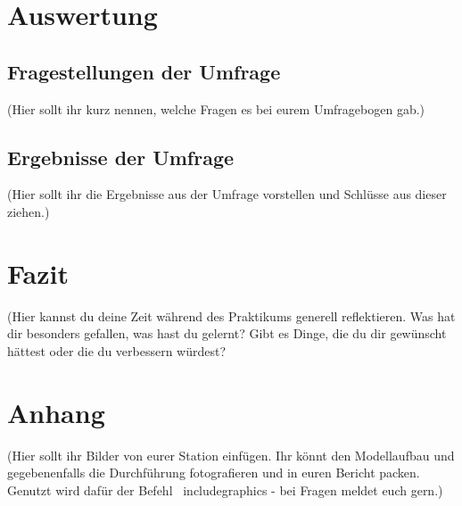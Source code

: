 \documentclass[11pt,a4paper,titlepage]{article}
\begin{document}
\newpage
\section{Auswertung}
\subsection{Fragestellungen der Umfrage}
(Hier sollt ihr kurz nennen, welche Fragen es bei eurem Umfragebogen gab.)
\subsection{Ergebnisse der Umfrage}
(Hier sollt ihr die Ergebnisse aus der Umfrage vorstellen und Schlüsse aus dieser ziehen.)
\newpage
\section{Fazit}
(Hier kannst du deine Zeit während des Praktikums generell reflektieren. Was hat dir besonders gefallen, was hast du gelernt? Gibt es Dinge, die du dir gewünscht hättest oder die du verbessern würdest? 

\newpage
\section{Anhang}
(Hier sollt ihr Bilder von eurer Station einfügen. Ihr könnt den Modellaufbau und gegebenenfalls die Durchführung fotografieren und in euren Bericht packen. Genutzt wird dafür der Befehl \ includegraphics - bei Fragen meldet euch gern.)
\label{sec:models}


\newpage
\printbibliography[heading=bibintoc]
\end{document}
